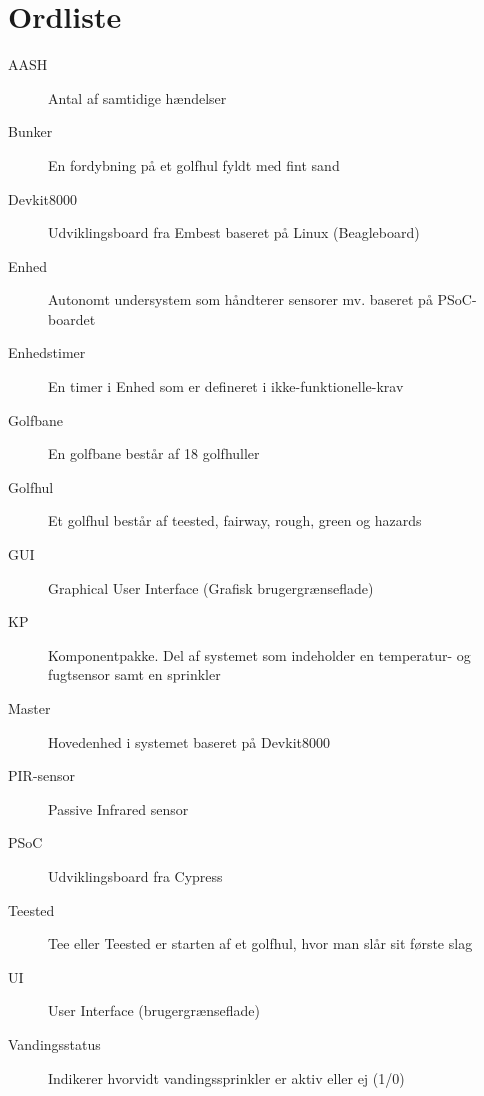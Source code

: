 \chapter{Ordliste}


\begin{description}

\item[AASH] Antal af samtidige hændelser
\item[Bunker] En fordybning på et golfhul fyldt med fint sand
\item[Devkit8000] Udviklingsboard fra Embest baseret på Linux (Beagleboard)
\item[Enhed] Autonomt undersystem som håndterer sensorer mv. baseret på PSoC-boardet
\item[Enhedstimer] En timer i Enhed som er defineret i ikke-funktionelle-krav
\item[Golfbane] En golfbane består af 18 golfhuller
\item[Golfhul] Et golfhul består af teested, fairway, rough, green og hazards
\item[GUI] Graphical User Interface (Grafisk brugergrænseflade)
\item[KP] Komponentpakke. Del af systemet som indeholder en temperatur- og fugtsensor samt en sprinkler
\item[Master] Hovedenhed i systemet baseret på Devkit8000
\item[PIR-sensor] Passive Infrared sensor
\item[PSoC] Udviklingsboard fra Cypress
\item[Teested] Tee eller Teested er starten af et golfhul, hvor man slår sit første slag
\item[UI] User Interface (brugergrænseflade)
\item[Vandingsstatus] Indikerer hvorvidt vandingssprinkler er aktiv eller ej (1/0)


\end{description}